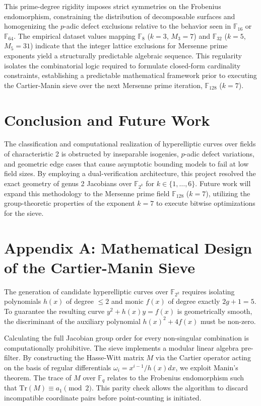 \documentclass[12pt, letterpaper]{article}
\begin{document}
This prime-degree rigidity imposes strict symmetries on the Frobenius endomorphism, constraining the distribution of decomposable surfaces and homogenizing the $p$-adic defect exclusions relative to the behavior seen in $\mathbb{F}_{16}$ or $\mathbb{F}_{64}$. The empirical dataset values mapping $\mathbb{F}_8$ ($k=3$, $M_3=7$) and $\mathbb{F}_{32}$ ($k=5$, $M_5=31$) indicate that the integer lattice exclusions for Mersenne prime exponents yield a structurally predictable algebraic sequence. This regularity isolates the combinatorial logic required to formulate closed-form cardinality constraints, establishing a predictable mathematical framework prior to executing the Cartier-Manin sieve over the next Mersenne prime iteration, $\mathbb{F}_{128}$ ($k=7$).

\section{Conclusion and Future Work}
The classification and computational realization of hyperelliptic curves over fields of characteristic 2 is obstructed by inseparable isogenies, $p$-adic defect variations, and geometric edge cases that cause asymptotic bounding models to fail at low field sizes. By employing a dual-verification architecture, this project resolved the exact geometry of genus 2 Jacobians over $\mathbb{F}_{2^k}$ for $k \in \{1, \dots, 6\}$. Future work will expand this methodology to the Mersenne prime field $\mathbb{F}_{128}$ ($k=7$), utilizing the group-theoretic properties of the exponent $k=7$ to execute bitwise optimizations for the sieve.

\section*{Appendix A: Mathematical Design of the Cartier-Manin Sieve}
The generation of candidate hyperelliptic curves over $\mathbb{F}_{2^k}$ requires isolating polynomials $h(x)$ of degree $\le 2$ and monic $f(x)$ of degree exactly $2g+1=5$. To guarantee the resulting curve $y^2 + h(x)y = f(x)$ is geometrically smooth, the discriminant of the auxiliary polynomial $h(x)^2 + 4f(x)$ must be non-zero. 

Calculating the full Jacobian group order for every non-singular combination is computationally prohibitive. The sieve implements a modular linear algebra pre-filter. By constructing the Hasse-Witt matrix $M$ via the Cartier operator acting on the basis of regular differentials $\omega_i = x^{i-1}/h(x) dx$, we exploit Manin's theorem. The trace of $M$ over $\mathbb{F}_q$ relates to the Frobenius endomorphism such that $\text{Tr}(M) \equiv a_1 \pmod 2$. This parity check allows the algorithm to discard incompatible coordinate pairs before point-counting is initiated. 
\end{document}
